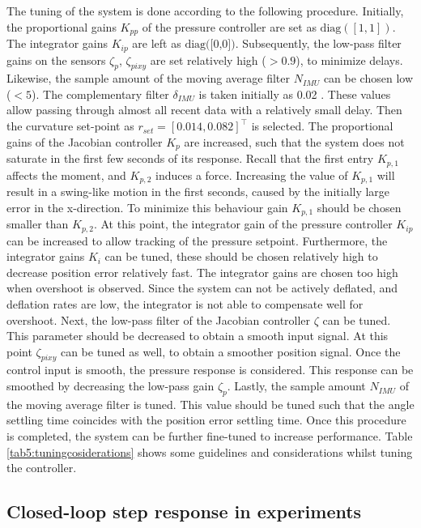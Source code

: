 The tuning of the system is done according to the following procedure. Initially, the proportional gains $K_{pp}$ of the pressure controller are set as $\text{diag}([1,1])$. The integrator gains $K_{ip}$ are left as $\text{diag([0,0])}$. Subsequently, the low-pass filter gains on the sensors $\zeta_p$, $\zeta_{pixy}$ are set relatively high ($>0.9$), to minimize delays. Likewise, the sample amount of the moving average filter $N_{IMU}$ can be chosen low ($<5$). The complementary filter $\delta_{IMU}$ is taken initially as 0.02 \cite{compfilter}. These values allow passing through almost all recent data with a relatively small delay. Then the curvature set-point as $r_{set} = [0.014,0.082]^\top$ is selected. The proportional gains of the Jacobian controller $K_p$ are increased, such that the system does not saturate in the first few seconds of its response. Recall that the first entry $K_{p,1}$ affects the moment, and $K_{p,2}$ induces a force. Increasing the value of $K_{p,1}$ will result in a swing-like motion in the first seconds, caused by the initially large error in the x-direction. To minimize this behaviour gain $K_{p,1}$ should be chosen smaller than $K_{p,2}$. At this point, the integrator gain of the pressure controller $K_{ip}$ can be increased to allow tracking of the pressure setpoint. Furthermore, the integrator gains $K_i$ can be tuned, these should be chosen relatively high to decrease position error relatively fast. The integrator gains are chosen too high when overshoot is observed. Since the system can not be actively deflated, and deflation rates are low, the integrator is not able to compensate well for overshoot. Next, the low-pass filter of the Jacobian controller $\zeta$ can be tuned. This parameter should be decreased to obtain a smooth input signal. At this point $\zeta_{pixy}$ can be tuned as well, to obtain a smoother position signal. Once the control input is smooth, the pressure response is considered. This response can be smoothed by decreasing the low-pass gain $\zeta_p$. Lastly, the sample amount $N_{IMU}$ of the moving average filter is tuned. This value should be tuned such that the angle settling time coincides with the position error settling time. Once this procedure is completed, the system can be further fine-tuned to increase performance. Table \ref{tab5:tuningcosiderations} shows some guidelines and considerations whilst tuning the controller.



\subsection*{Closed-loop step response in experiments}


